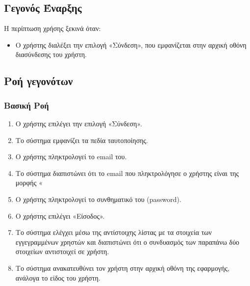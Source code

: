 \documentclass[12pt,a4paper,twoside]{book}
\begin{document}
\subsection{Γεγονός Έναρξης}
Η περίπτωση χρήσης ξεκινά όταν:
\begin{itemize}
  \item Ο χρήστης διαλέξει την επιλογή «Σύνδεση», που εμφανίζεται στην αρχική οθόνη διασύνδεσης του χρήστη. %
\end{itemize}

\subsection{Ροή γεγονότων}

\subsubsection{Βασική Ροή}
\begin{enumerate}
  \item Ο χρήστης επιλέγει την επιλογή «Σύνδεση». %
  \item Το σύστημα εμφανίζει τα πεδία ταυτοποίησης. %
  \item Ο χρήστης πληκτρολογεί το email του.  %
  \item Το σύστημα διαπιστώνει ότι το email που πληκτρολόγησε ο χρήστης είναι της μορφής «%
  \item Ο χρήστης πληκτρολογεί το συνθηματικό του (password). %
  \item Ο χρήστης επιλέγει «Είσοδος». %
  \item Το σύστημα ελέγχει μέσω της αντίστοιχης λίστας με τα στοιχεία των εγγεγραμμένων χρηστών και διαπιστώνει ότι ο συνδυασμός των παραπάνω δύο στοιχείων αντιστοιχεί σε χρήστη. %
  \item Το σύστημα ανακατευθύνει τον χρήστη στην αρχική οθόνη της εφαρμογής, ανάλογα το είδος του χρήστη. %
\end{enumerate}
\end{document}
